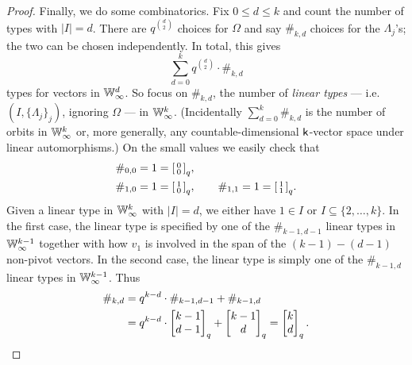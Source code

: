 \begin{proof}
    Finally, we do some combinatorics.
    Fix $0 \leq d \leq k$ and count the number of types with $|I| = d$.
    There are $q^{\binom{d}{2}}$ choices for $\Omega$ and say $\#_{k, d}$ choices for the $\Lambda_j$'s;
    the two can be chosen independently.
    In total, this gives
    \[ 
        \sum_{d=0}^k q^{\binom{d}{2}} \cdot \#_{k, d} 
    \]
    types for vectors in $\mathbb{W}_\infty^d$.
    So focus on $\#_{k, d}$, the number of \emph{linear types} --- i.e.~$(I, \{\Lambda_j\}_j)$, ignoring $\Omega$ --- in $\mathbb{W}_\infty^k$.
    (Incidentally $\sum_{d=0}^k \#_{k, d}$ is the number of orbits in $\mathbb{W}_\infty^k$ or, more generally, any countable-dimensional $\mathsf{k}$-vector space under linear automorphisms.)
    On the small values we easily check that \begin{align*}
        &\#_{0, 0} = 1 = \begin{bsmallmatrix}0 \\ 0\end{bsmallmatrix}_q, \\
        &\#_{1, 0} = 1 = \begin{bsmallmatrix}1 \\ 0\end{bsmallmatrix}_q,\qquad
        \#_{1, 1} = 1 = \begin{bsmallmatrix}1 \\ 1\end{bsmallmatrix}_q.
    \end{align*}
    Given a linear type in $\mathbb{W}_\infty^k$ with $\vert I \vert = d$, 
    we either have $1 \in I$ or $I \subseteq \{2, \ldots, k\}$.
    In the first case, the linear type is specified by one of the $\#_{k-1, d-1}$ linear types in $\mathbb{W}_\infty^{k-1}$
    together with how $v_1$ is involved in the span of the $(k - 1) - (d - 1)$ non-pivot vectors.
    In the second case, the linear type is simply one of the $\#_{k-1, d}$ linear types in $\mathbb{W}_\infty^{k-1}$.
    Thus 
    \begin{align*}
        \#_{k, d} 
        &= q^{k-d} \cdot \#_{k-1, d-1} + \#_{k-1, d} \\
        &= q^{k-d} \cdot \begin{bmatrix}k-1 \\ d-1\end{bmatrix}_q + \begin{bmatrix}k-1 \\ d\end{bmatrix}_q
        = \begin{bmatrix}k \\ d\end{bmatrix}_q.
        \qedhere
    \end{align*}
\end{proof}

